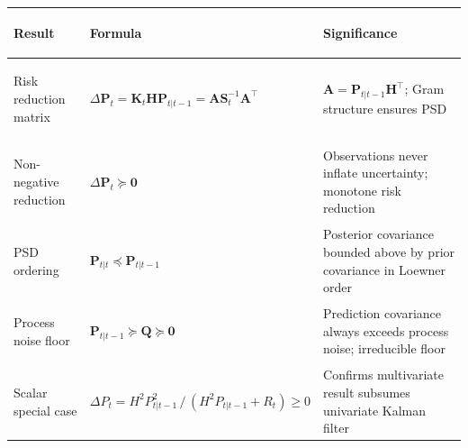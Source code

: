 \documentclass[12pt,openany]{book}
\numberwithin{equation}{chapter}
\theoremstyle{plain}
\theoremstyle{definition}
\theoremstyle{remark}
\renewcommand{\arraystretch}{1.2}
\begin{document}
\begin{center}
\small
\renewcommand{\arraystretch}{1.40}
\begin{tabularx}{\linewidth}{@{}
  >{\bfseries\raggedright\arraybackslash}p{3.4cm}
  >{\raggedright\arraybackslash}p{4.4cm}
  >{\raggedright\arraybackslash}X
@{}}
\toprule
Result & Formula & Significance \\
\midrule
Risk reduction matrix &
$\Delta\mathbf{P}_t = \mathbf{K}_t\mathbf{H}\mathbf{P}_{t|t-1} = \mathbf{A}\mathbf{S}_t^{-1}\mathbf{A}^\top$ &
$\mathbf{A}=\mathbf{P}_{t|t-1}\mathbf{H}^\top$; Gram structure ensures PSD \\
Non-negative reduction &
$\Delta\mathbf{P}_t\succeq\mathbf{0}$ &
Observations never inflate uncertainty; monotone risk reduction \\
PSD ordering &
$\mathbf{P}_{t|t}\preceq\mathbf{P}_{t|t-1}$ &
Posterior covariance bounded above by prior covariance in Loewner order \\
Process noise floor &
$\mathbf{P}_{t|t-1}\succeq\mathbf{Q}\succeq\mathbf{0}$ &
Prediction covariance always exceeds process noise; irreducible floor \\
Scalar special case &
$\Delta P_t = H^2 P_{t|t-1}^2\,/\,(H^2 P_{t|t-1}+R_t)\geq 0$ &
Confirms multivariate result subsumes univariate Kalman filter \\
\bottomrule
\end{tabularx}
\end{center}
\end{document}
